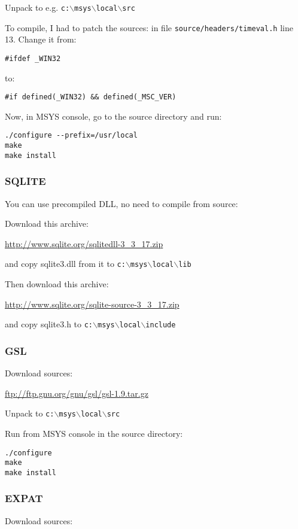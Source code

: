 Unpack to e.g. \texttt{c:$\backslash$msys$\backslash$local$\backslash$src}

To compile, I had to patch the sources: in file \texttt{source/headers/timeval.h} line 13.
Change it from:

\begin{verbatim}
#ifdef _WIN32
\end{verbatim}
to:

\begin{verbatim}
#if defined(_WIN32) && defined(_MSC_VER)
\end{verbatim}

Now, in MSYS console, go to the source directory and run:

\begin{verbatim}
./configure --prefix=/usr/local
make
make install
\end{verbatim}

\subsubsection{SQLITE}
You can use precompiled DLL, no need to compile from source:

Download this archive:


\url{http://www.sqlite.org/sqlitedll-3\_3\_17.zip}

and copy sqlite3.dll from it to \texttt{c:$\backslash$msys$\backslash$local$\backslash$lib}

Then download this archive:

\url{http://www.sqlite.org/sqlite-source-3\_3\_17.zip}

and copy sqlite3.h to \texttt{c:$\backslash$msys$\backslash$local$\backslash$include}

\subsubsection{GSL}
Download sources:

\url{ftp://ftp.gnu.org/gnu/gsl/gsl-1.9.tar.gz}

Unpack to \texttt{c:$\backslash$msys$\backslash$local$\backslash$src}

Run from MSYS console in the source directory:

\begin{verbatim}
./configure
make
make install
\end{verbatim}

\subsubsection{EXPAT}
Download sources:

